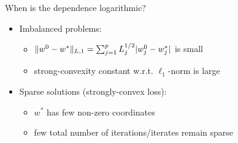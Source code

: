 \documentclass[aspectratio=169,17pt,t]{beamer}
\begin{document}
\begin{frame}{\Large When is the dependence logarithmic?}
  \begin{itemize}
  \item Imbalanced problems:
    \vspace{0.5em}
    \begin{itemize}
    \item $\lVert w^0 - w^*\rVert_{L,1} = \sum_{j=1}^p L_j^{1/2} | w_j^0-w_j^* |$ is small
    \vspace{0.2em}
    \item strong-convexity constant w.r.t. $\ell_1$-norm is large
    \end{itemize}

    \pause
    \vspace{1em}

  \item Sparse solutions (strongly-convex loss):
    \vspace{0.5em}
    \begin{itemize}
    \item $w^*$ has few non-zero coordinates
      \vspace{0.2em}
    \item few total number of iterations/iterates remain sparse
    \end{itemize}
  \end{itemize}
\end{frame}




\end{document}
